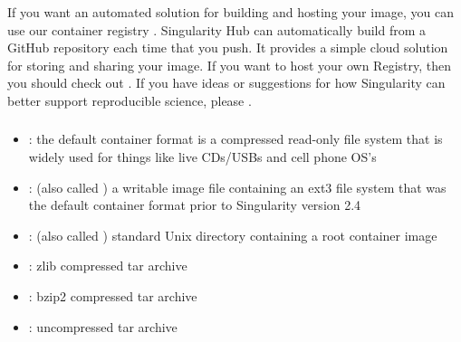 \documentclass[letterpaper,10pt,english]{sphinxmanual}
\begin{document}
If you want an automated solution for building and hosting your image,
you can use our container registry . Singularity Hub
can automatically build {\hyperref[\detokenize{container_recipes:container-recipes}]{}} from
a GitHub repository each time that you push. It provides a simple cloud
solution for storing and sharing your image. If you want to host your own
Registry, then you should check out .
If you have ideas or suggestions for how Singularity can better support
reproducible science, please .


\subsubsection{}
\label{\detokenize{introduction:supported-container-formats}}\begin{itemize}
\item {} 
: the default container format is a compressed read-only
file system that is widely used for things like live CDs/USBs and
cell phone OS’s

\item {} 
: (also called ) a writable image file containing an ext3
file system that was the default container format prior to
Singularity version 2.4

\item {} 
: (also called ) standard Unix directory containing a
root container image

\item {} 
: zlib compressed tar archive

\item {} 
: bzip2 compressed tar archive

\item {} 
: uncompressed tar archive

\end{itemize}
\end{document}
